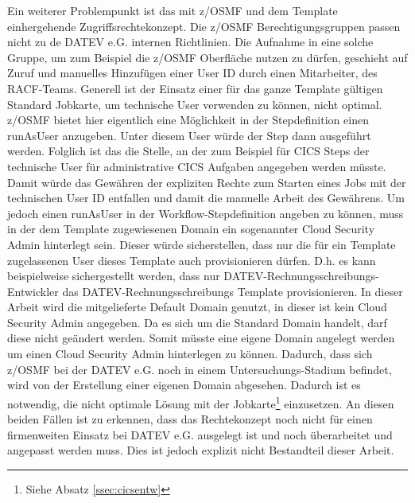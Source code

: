 Ein weiterer Problempunkt ist das mit z/OSMF und dem Template einhergehende Zugriffsrechtekonzept.
Die z/OSMF Berechtigungsgruppen passen nicht zu de DATEV e.G. internen Richtlinien.
Die Aufnahme in eine solche Gruppe, um zum Beispiel die z/OSMF Oberfläche nutzen zu dürfen, geschieht auf Zuruf und manuelles Hinzufügen einer User ID durch einen Mitarbeiter, des RACF-Teams.
Generell ist der Einsatz einer für das ganze Template gültigen Standard Jobkarte, um technische User verwenden zu können, nicht optimal.
z/OSMF bietet hier eigentlich eine Möglichkeit in der Stepdefinition einen \glqq runAsUser\grqq{} anzugeben.
Unter diesem User würde der Step dann ausgeführt werden.
Folglich ist das die Stelle, an der zum Beispiel für CICS Steps der technische User für administrative CICS Aufgaben angegeben werden müsste.
Damit würde das Gewähren der expliziten Rechte zum Starten eines Jobs mit der technischen User ID entfallen und damit die manuelle Arbeit des \glqq Gewährens\grqq.
Um jedoch einen \glqq runAsUser\grqq{} in der Workflow-Stepdefinition angeben zu können, muss in der dem Template zugewiesenen Domain ein sogenannter \glqq Cloud Security Admin\grqq{} hinterlegt sein.
Dieser würde sicherstellen, dass nur die für ein Template zugelassenen User dieses Template auch provisionieren dürfen.
D.h. es kann beispielweise sichergestellt werden, dass nur DATEV-Rechnungsschreibungs-Entwickler das DATEV-Rechnungsschreibungs Template provisionieren.
In dieser Arbeit wird die mitgelieferte \glqq Default Domain\grqq{} genutzt, in dieser ist kein \glqq Cloud Security Admin\grqq{} angegeben.
Da es sich um die Standard Domain handelt, darf diese nicht geändert werden.
Somit müsste eine eigene Domain angelegt werden um einen Cloud Security Admin  hinterlegen zu können.
Dadurch, dass sich z/OSMF bei der DATEV e.G. noch in einem Untersuchungs-Stadium  befindet, wird von der Erstellung einer eigenen Domain abgesehen.
Dadurch ist es notwendig, die nicht optimale Lösung mit der Jobkarte\footnote{Siehe Absatz \ref{ssec:cicsentw}} einzusetzen.
An diesen beiden Fällen ist zu erkennen, dass das Rechtekonzept noch nicht für einen firmenweiten Einsatz bei DATEV e.G. ausgelegt ist und noch überarbeitet und angepasst werden muss.
Dies ist jedoch explizit nicht Bestandteil dieser Arbeit.


 
